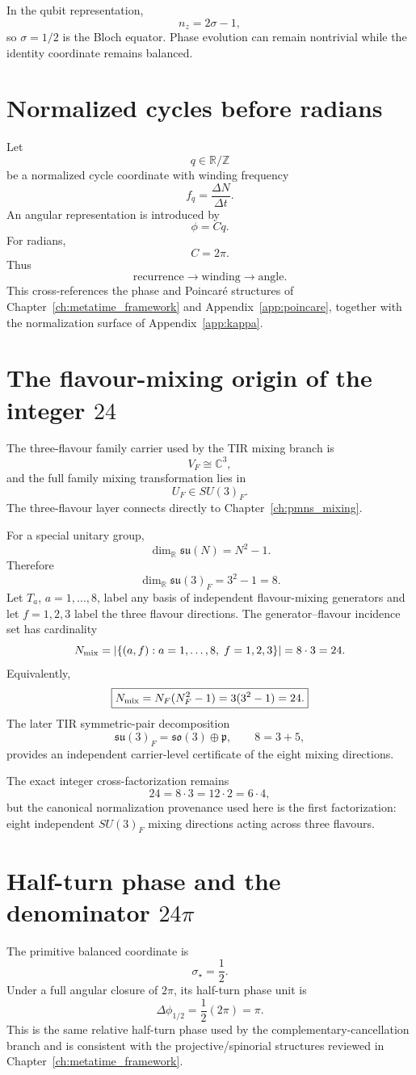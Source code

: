 In the qubit representation,
\[
n_z=2\sigma-1,
\]
so $\sigma=1/2$ is the Bloch equator. Phase evolution can remain nontrivial while the identity coordinate remains balanced.

\section{Normalized cycles before radians}
Let
\[
q\in\mathbb R/\mathbb Z
\]
be a normalized cycle coordinate with winding frequency
\[
f_q=\frac{\Delta N}{\Delta t}.
\]
An angular representation is introduced by
\[
\phi=Cq.
\]
For radians,
\[
C=2\pi.
\]
Thus
\[
\text{recurrence}\to\text{winding}\to\text{angle}.
\]
This cross-references the phase and Poincar\'e structures of Chapter~\ref{ch:metatime_framework} and Appendix~\ref{app:poincare}, together with the normalization surface of Appendix~\ref{app:kappa}.

\section{The flavour-mixing origin of the integer $24$}
\label{sec:appP-flavour-24}
The three-flavour family carrier used by the TIR mixing branch is
\[
V_F\cong\mathbb C^3,
\]
and the full family mixing transformation lies in
\[
U_F\in SU(3)_F.
\]
The three-flavour layer connects directly to Chapter~\ref{ch:pmns_mixing}.

For a special unitary group,
\[
\dim_{\mathbb R}\mathfrak{su}(N)=N^2-1.
\]
Therefore
\[
\boxed{
\dim_{\mathbb R}\mathfrak{su}(3)_F=3^2-1=8.
}
\]
Let $T_a$, $a=1,\ldots,8$, label any basis of independent flavour-mixing generators and let $f=1,2,3$ label the three flavour directions. The generator--flavour incidence set has cardinality
\begin{equation}
N_{\rm mix}
=\left|\{(a,f):a=1,\ldots,8,\;f=1,2,3\}\right|
=8\cdot3
=24.
\label{eq:appP-24}
\end{equation}
Equivalently,
\[
\boxed{
N_{\rm mix}=N_F(N_F^2-1)=3(3^2-1)=24.
}
\]
The later TIR symmetric-pair decomposition
\[
\mathfrak{su}(3)_F
=\mathfrak{so}(3)\oplus\mathfrak p,
\qquad
8=3+5,
\]
provides an independent carrier-level certificate of the eight mixing directions.

The exact integer cross-factorization remains
\[
24=8\cdot3=12\cdot2=6\cdot4,
\]
but the canonical normalization provenance used here is the first factorization: eight independent $SU(3)_F$ mixing directions acting across three flavours.

\section{Half-turn phase and the denominator $24\pi$}
The primitive balanced coordinate is
\[
\sigma_\star=\frac12.
\]
Under a full angular closure of $2\pi$, its half-turn phase unit is
\[
\boxed{
\Delta\phi_{1/2}=\frac12(2\pi)=\pi.
}
\]
This is the same relative half-turn phase used by the complementary-cancellation branch and is consistent with the projective/spinorial structures reviewed in Chapter~\ref{ch:metatime_framework}.

